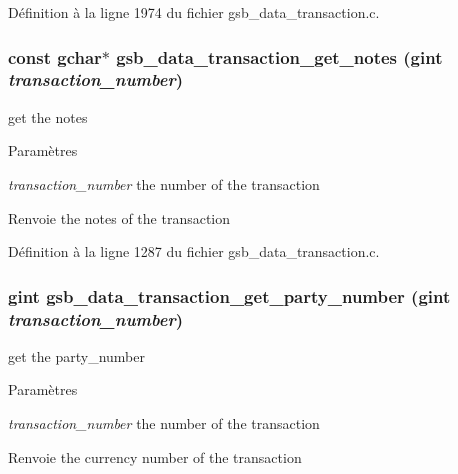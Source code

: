 Définition à la ligne 1974 du fichier gsb\_\-data\_\-transaction.c.

\subsubsection[{gsb\_\-data\_\-transaction\_\-get\_\-notes}]{\setlength{\rightskip}{0pt plus 5cm}const gchar$\ast$ gsb\_\-data\_\-transaction\_\-get\_\-notes (gint {\em transaction\_\-number})}\label{gsb__data__transaction_8c_ad73b393673217f5b9cc295c74e030550}
get the notes


\begin{DoxyParams}{Paramètres}
\item[{\em transaction\_\-number}]the number of the transaction\end{DoxyParams}
\begin{DoxyReturn}{Renvoie}
the notes of the transaction 
\end{DoxyReturn}


Définition à la ligne 1287 du fichier gsb\_\-data\_\-transaction.c.

\subsubsection[{gsb\_\-data\_\-transaction\_\-get\_\-party\_\-number}]{\setlength{\rightskip}{0pt plus 5cm}gint gsb\_\-data\_\-transaction\_\-get\_\-party\_\-number (gint {\em transaction\_\-number})}\label{gsb__data__transaction_8c_afa032df45afa2ad7a4be48449a7e8d15}
get the party\_\-number


\begin{DoxyParams}{Paramètres}
\item[{\em transaction\_\-number}]the number of the transaction\end{DoxyParams}
\begin{DoxyReturn}{Renvoie}
the currency number of the transaction 
\end{DoxyReturn}


